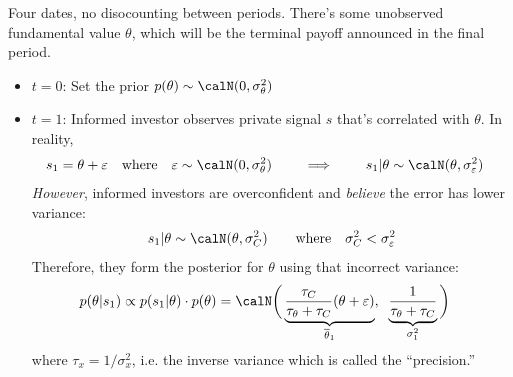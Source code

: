 \documentclass[12pt]{article}
\theoremstyle{plain}
\theoremstyle{definition}
\theoremstyle{remark}
\begin{document}
Four dates, no disocounting between periods. There's some unobserved
fundamental value $\theta$, which will be the terminal payoff announced
in the final period.
\begin{itemize}
  \item $t=0$: Set the prior
    $p(\theta)\sim\calN(0,\sigma_\theta^2)$

  \item $t=1$: Informed investor observes private signal $s$ that's
    correlated with $\theta$. In reality,
    \begin{align*}
      s_1 &= \theta + \varepsilon
      \quad
      \text{where}\quad
       \varepsilon\sim\calN(0, \sigma_\theta^2)
      \qquad\implies\qquad
      s_1|\theta \sim\calN(\theta, \sigma_\varepsilon^2)
    \end{align*}
    \emph{However}, informed investors are overconfident and
    \emph{believe} the error has lower variance:
    \begin{align*}
      s_1|\theta \sim\calN(\theta, \sigma_C^2)
      \qquad\text{where}\quad
      \sigma^2_{C}<\sigma^2_\varepsilon
    \end{align*}
    Therefore, they form the posterior for $\theta$ using that incorrect
    variance:
    \begin{align*}
      p(\theta|s_1)
      &\propto
      p(s_1|\theta)
      \cdot p(\theta)
      =
      \calN\bigg(
        \underbrace{
          \frac{\tau_C}{\tau_\theta+\tau_C}
          (\theta+\varepsilon)
        }_{\overline{\theta}_1}
        ,\;\;
        \underbrace{
        \frac{1}{\tau_\theta+\tau_C}
        }_{\sigma^2_1}
      \bigg)
    \end{align*}
    where $\tau_x=1/\sigma^2_x$, i.e. the inverse variance which is
    called the ``precision.''


\end{itemize}
\end{document}
